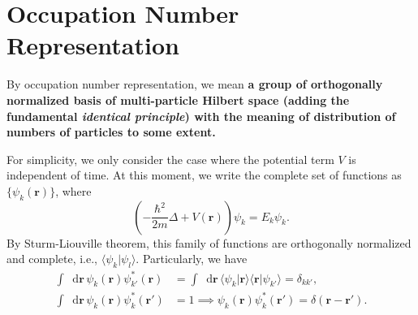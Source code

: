 \documentclass[b5paper,10pt,UTF8]{book}
\newcommand*\dd{\mathop{}\!\mathrm{d}}
\numberwithin{equation}{section}
\begin{document}
	\section{Occupation Number Representation}
		By occupation number representation, we mean \textbf{a group of orthogonally normalized basis of multi-particle Hilbert space (adding the fundamental \emph{identical principle}) with the meaning of distribution of numbers of particles to some extent.}\par
		For simplicity, we only consider the case where the potential term $V$ is independent of time. At this moment, we write the complete set of functions as $\{\psi_k(\bm{r})\}$, where
		$$\left(-\dfrac{\hbar^2}{2m}\Delta+V(\bm{r})\right)\psi_k=E_k\psi_k.$$
		By Sturm-Liouville theorem, this family of functions are orthogonally normalized and complete, i.e., $\langle\psi_k|\psi_l\rangle$. Particularly, we have
		\begin{align}
			\int\dd\bm{r}\,\psi_k(\bm{r})\psi^*_{k'}(\bm{r})&=\int\dd\bm{r}\,\langle\psi_k|\bm{r}\rangle\langle\bm{r}|\psi_{k'}\rangle=\delta_{kk'},\label{1.3.1}\\
			\int\dd\bm{r}\,\psi_k(\bm{r})\psi^*_k(\bm{r'})&=1\implies\psi_k(\bm{r})\psi^*_k(\bm{r'})=\delta(\bm{r}-\bm{r'}).\label{1.3.2}
		\end{align}
\end{document}
